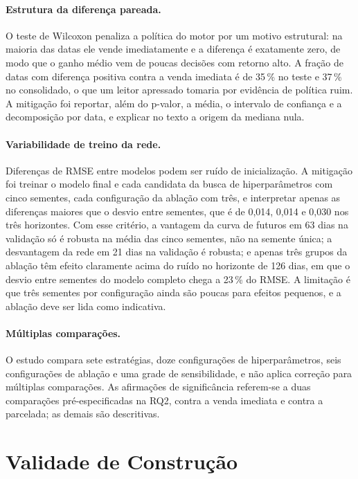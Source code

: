 \paragraph{Estrutura da diferença pareada.} O teste de Wilcoxon penaliza a política do motor por um motivo estrutural: na maioria das datas ele vende imediatamente e a diferença é exatamente zero, de modo que o ganho médio vem de poucas decisões com retorno alto. A fração de datas com diferença positiva contra a venda imediata é de 35\,\% no teste e 37\,\% no consolidado, o que um leitor apressado tomaria por evidência de política ruim. A mitigação foi reportar, além do p-valor, a média, o intervalo de confiança e a decomposição por data, e explicar no texto a origem da mediana nula.

\paragraph{Variabilidade de treino da rede.} Diferenças de RMSE entre modelos podem ser ruído de inicialização. A mitigação foi treinar o modelo final e cada candidata da busca de hiperparâmetros com cinco sementes, cada configuração da ablação com três, e interpretar apenas as diferenças maiores que o desvio entre sementes, que é de 0,014, 0,014 e 0,030 nos três horizontes. Com esse critério, a vantagem da curva de futuros em 63 dias na validação só é robusta na média das cinco sementes, não na semente única; a desvantagem da rede em 21 dias na validação é robusta; e apenas três grupos da ablação têm efeito claramente acima do ruído no horizonte de 126 dias, em que o desvio entre sementes do modelo completo chega a 23\,\% do RMSE. A limitação é que três sementes por configuração ainda são poucas para efeitos pequenos, e a ablação deve ser lida como indicativa.

\paragraph{Múltiplas comparações.} O estudo compara sete estratégias, doze configurações de hiperparâmetros, seis configurações de ablação e uma grade de sensibilidade, e não aplica correção para múltiplas comparações. As afirmações de significância referem-se a duas comparações pré-especificadas na RQ2, contra a venda imediata e contra a parcelada; as demais são descritivas.

\section{Validade de Construção}\label{sec2:amc-construcao}


